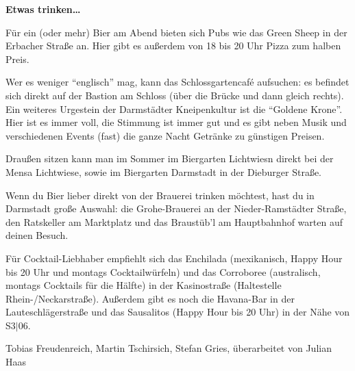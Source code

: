 {    \textbf{Etwas trinken…}

    Für ein (oder mehr) Bier am Abend bieten sich Pubs wie das Green Sheep in der Erbacher Straße an. Hier gibt es außerdem von 18 bis 20 Uhr Pizza zum halben Preis.

    Wer es weniger "`englisch"' mag, kann das Schlossgartencaf\'e aufsuchen: es befindet sich direkt auf der Bastion am Schloss (über die Brücke und dann gleich rechts).
    Ein weiteres Urgestein der Darmstädter Kneipenkultur ist die "`Goldene Krone"'. Hier ist es immer voll, die Stimmung ist immer gut und es gibt neben Musik und verschiedenen Events (fast) die ganze Nacht Getränke zu günstigen Preisen.

    Draußen sitzen kann man im Sommer im Biergarten Lichtwiesn direkt bei der Mensa Lichtwiese, sowie im Biergarten Darmstadt in der Dieburger Straße.

    Wenn du Bier lieber direkt von der Brauerei trinken möchtest, hast du in Darmstadt große Auswahl: die Grohe-Brauerei an der Nieder-Ramstädter Straße, den Ratskeller am Marktplatz und das Braustüb'l am Hauptbahnhof warten auf deinen Besuch.

    Für Cocktail-Liebhaber empfiehlt sich das Enchilada (mexikanisch, Happy Hour bis 20 Uhr und montags Cocktailwürfeln) und das Corroboree (australisch, montags Cocktails für die Hälfte) in der Kasinostraße (Haltestelle Rhein-/Neckarstraße). Außerdem gibt es noch die Havana-Bar in der Lauteschlägerstraße und das Sausalitos (Happy Hour bis 20 Uhr) in der Nähe von S3$|$06.
}
{Tobias Freudenreich, Martin Tschirsich, Stefan Gries,
    überarbeitet von Julian Haas}

\newpage
